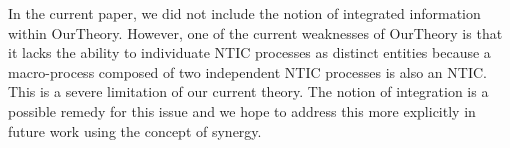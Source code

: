 \documentclass[utf8]{article}
\begin{document}
		    In the current paper, we did not include the notion of integrated information within \ac{OurTheory}. However, one of the current weaknesses of \ac{OurTheory} is that it lacks the ability to individuate NTIC processes as distinct entities because a macro-process composed of two independent NTIC processes is also an NTIC. This is a severe limitation of our current theory.  The notion of integration is a possible remedy for this issue and we hope to address this more explicitly in future work using the concept of synergy. 
		    



    		    
    		    
    		    
    		    
		
		
    		
\end{document}
